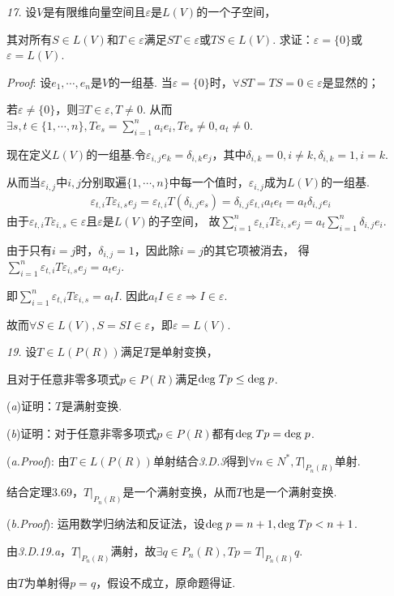 \newpage

\textit{17.}
设$V$是有限维向量空间且$\varepsilon$是$L(V)$的一个子空间，

其对所有$S \in L(V)$和$T \in \varepsilon$满足$ST \in \varepsilon$或$TS \in L(V)$.
求证：$\varepsilon=\{0\}$或$\varepsilon=L(V)$.

\textit{Proof}:
设$e_1,\cdots,e_n$是$V$的一组基.
当$\varepsilon =\{0\}$时，$\forall ST=TS=0 \in \varepsilon$是显然的；

若$\varepsilon \ne \{0\}$，则$\exists T \in \varepsilon, T \ne 0$.
从而$\exists s,t \in \{1,\cdots,n\},Te_s=\sum_{i=1}^n a_ie_i ,Te_s \ne 0, a_t \ne 0$.

现在定义$L(V)$的一组基.令$\varepsilon_{i,j}e_k=\delta_{i,k}e_j$，其中$\delta_{i,k}=0,i \ne k,\delta_{i,k}=1,i=k$.

从而当$\varepsilon_{i,j}$中$i,j$分别取遍$\{1,\cdots,n\}$中每一个值时，$\varepsilon_{i,j}$成为$L(V)$的一组基.
    \begin{align*}
        \varepsilon_{t,i}T\varepsilon_{i,s}e_j=\varepsilon_{t,i}T(\delta_{i,j} e_s) 
        =\delta_{i,j}\varepsilon_{t,i}a_te_t=a_t\delta_{i,j}e_i
    \end{align*}
由于$\varepsilon_{t,i}T\varepsilon_{i,s} \in \varepsilon$且$\varepsilon$是$L(V)$的子空间，
故$\sum_{i=1}^n \varepsilon_{t,i}T\varepsilon_{i,s}e_j=a_t \sum_{i=1}^n \delta_{i,j}e_i$.

由于只有$i=j$时，$\delta_{i,j}=1$，因此除$i=j$的其它项被消去，
得$\sum_{i=1}^n \varepsilon_{t,i} T \varepsilon_{i,s} e_j=a_te_j$.

即$\sum_{i=1}^n \varepsilon_{t,i} T \varepsilon_{i,s} =a_t I$.
因此$a_t I \in \varepsilon \Rightarrow I \in \varepsilon$.

故而$\forall S \in L(V),S=SI \in \varepsilon$，即$\varepsilon=L(V)$.

\hspace*{\fill}

\textit{19.}
设$T \in L(P(R))$满足$T$是单射变换，

且对于任意非零多项式$p \in P(R)$满足$\mathrm{deg \;} Tp \leq \mathrm{deg \;} p$.

(\textit{a})证明：$T$是满射变换.

(\textit{b})证明：对于任意非零多项式$p \in P(R)$都有$\mathrm{deg \;} Tp=\mathrm{deg \;} p$.

(\textit{a.Proof}):
由$T \in L(P(R))$单射结合\textit{3.D.3}得到$\forall n \in N^*,T|_{P_n(R)}$单射.

结合定理3.69，$T|_{P_n(R)}$是一个满射变换，从而$T$也是一个满射变换.

(\textit{b.Proof}):
运用数学归纳法和反证法，设$\mathrm{deg \;} p=n+1,\mathrm{deg \;} Tp<n+1$.

由\textit{3.D.19.a}，$T|_{P_n(R)}$满射，故$\exists q \in P_n(R),Tp=T|_{P_n(R)}q$.

由$T$为单射得$p=q$，假设不成立，原命题得证.

